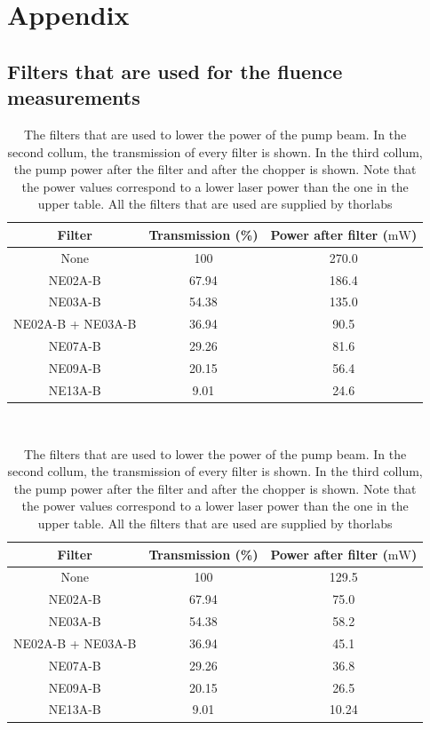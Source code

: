 \chapter{Appendix}
\label{sec:appendix}
\section{Filters that are used for the fluence measurements}
\begin{table}
    \centering
    \begin{tabular}{ccc}
        \toprule
        Filter & Transmission (\%)  & Power after filter ($\si{\milli\watt}$) \\
        \midrule
        None & 100 & 270.0 \\
        NE02A-B & 67.94 &  186.4 \\
        NE03A-B & 54.38 & 135.0  \\
        NE02A-B + NE03A-B & 36.94 & 90.5 \\
        NE07A-B & 29.26 & 81.6 \\
        NE09A-B & 20.15 & 56.4 \\
        NE13A-B & 9.01 & 24.6 \\
        \bottomrule
    \end{tabular}
    \\
    \caption{The filters that are used to lower the power of the pump beam. In the second collum, the transmission of every filter is shown. In the third collum, the pump power after the filter and after the chopper is shown.
    Note that the power values correspond to the highest laser power that is available with the given setup. Measurements with lower initial laser power are also taken. All the filters that are used were bought from thorlabs \cite{thorlabs}.}
    \begin{tabular}{ccc}
        \toprule
        Filter & Transmission (\%)  & Power after filter ($\si{\milli\watt}$) \\
        \midrule
        None & 100 & 129.5 \\
        NE02A-B & 67.94 &  75.0 \\
        NE03A-B & 54.38 & 58.2  \\
        NE02A-B + NE03A-B & 36.94 & 45.1 \\
        NE07A-B & 29.26 & 36.8 \\
        NE09A-B & 20.15 & 26.5 \\
        NE13A-B & 9.01 & 10.24\\
        \bottomrule
    \end{tabular}
    \\
    \caption{The filters that are used to lower the power of the pump beam. In the second collum, the transmission of every filter is shown. In the third collum, the pump power after the filter and after the chopper is shown.
    Note that the power values correspond to a lower laser power than the one in the upper table. All the filters that are used are supplied by thorlabs \cite{thorlabs}}
    \label{tab:filters}
\end{table}
\newpage
